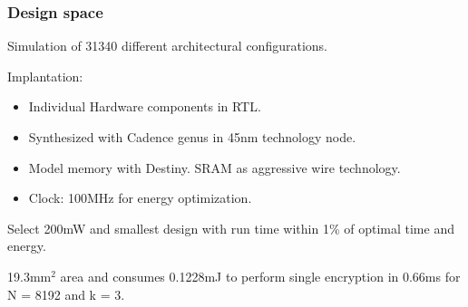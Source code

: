 \documentclass[10pt,handout]{beamer}
\begin{document}
\begin{frame}
\frametitle{Design space}
Simulation of 31340 different architectural configurations.

Implantation:
\pause
\begin{itemize}
    \item Individual Hardware components in RTL.
    \item Synthesized with Cadence genus in 45nm technology node.
\pause
    \item Model memory with Destiny. SRAM as aggressive wire technology.
    \item Clock: 100MHz for energy optimization.
\end{itemize}


\pause
Select 200mW and smallest design with run time within 1\% of optimal time and energy.

19.3mm$^2$ area and consumes 0.1228mJ to perform single encryption in 0.66ms for N = 8192 and k = 3.
\end{frame}






\end{document}
